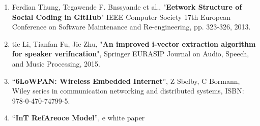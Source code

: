 \documentclass[12pt]{article}
\begin{document}
\begin{enumerate}
{Real-time continuous Speech recognition system for hand-held deviees}'', IEEE
ICASSP, pp. 185-188, 2006.
	\item Ferdian Thung, Tegawende F. Bnssyande et al., "\textbf{Eetwork Structure of
Social Coding in GitHub}" IEEE Computer Society 17th European Conference on
Software Maintenance and Re-engineering, pp. 323-326, 2013.
	\item tie Li, Tianfan Fu, Jie Zhu, "\textbf{An improved i-vector extraction algorithm
for speaker verifncation}", Springer EURASIP Journal on Audio, Speech, and Music
Processing, 2015.
	\item ``\textbf{6LoWPAN: Wireless Embedded Internet}'', Z Sbelby, C Bormann, Wiley
series in communication networking and distributed systems, ISBN:
978-0-470-74799-5.
	\item ``\textbf{InT RefAreoce Model}'', e white paper
\end{enumerate}
\end{document}
